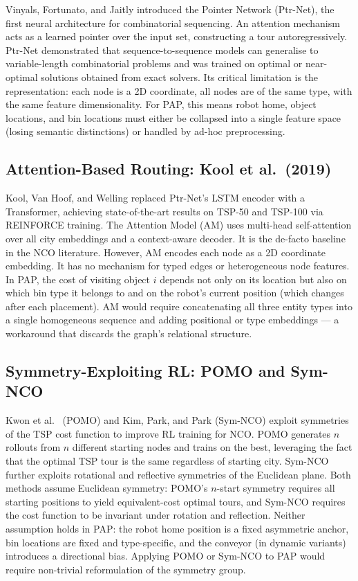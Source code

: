 \documentclass[conference]{IEEEtran}
\begin{document}
Vinyals, Fortunato, and Jaitly \cite{vinyals2015pointer} introduced the Pointer Network (Ptr-Net), the first neural architecture for combinatorial sequencing. An attention mechanism acts as a learned pointer over the input set, constructing a tour autoregressively. Ptr-Net demonstrated that sequence-to-sequence models can generalise to variable-length combinatorial problems and was trained on optimal or near-optimal solutions obtained from exact solvers. Its critical limitation is the representation: each node is a 2D coordinate, all nodes are of the same type, with the same feature dimensionality. For PAP, this means robot home, object locations, and bin locations must either be collapsed into a single feature space (losing semantic distinctions) or handled by ad-hoc preprocessing.

\subsection{Attention-Based Routing: Kool et al.\ (2019)}

Kool, Van Hoof, and Welling \cite{kool2019attention} replaced Ptr-Net's LSTM encoder with a Transformer, achieving state-of-the-art results on TSP-50 and TSP-100 via REINFORCE training. The Attention Model (AM) uses multi-head self-attention over all city embeddings and a context-aware decoder. It is the de-facto baseline in the NCO literature. However, AM encodes each node as a 2D coordinate embedding. It has no mechanism for typed edges or heterogeneous node features. In PAP, the cost of visiting object $i$ depends not only on its location but also on which bin type it belongs to and on the robot's current position (which changes after each placement). AM would require concatenating all three entity types into a single homogeneous sequence and adding positional or type embeddings --- a workaround that discards the graph's relational structure.

\subsection{Symmetry-Exploiting RL: POMO and Sym-NCO}

Kwon et al.\ \cite{kwon2020pomo} (POMO) and Kim, Park, and Park \cite{kim2022symnco} (Sym-NCO) exploit symmetries of the TSP cost function to improve RL training for NCO. POMO generates $n$ rollouts from $n$ different starting nodes and trains on the best, leveraging the fact that the optimal TSP tour is the same regardless of starting city. Sym-NCO further exploits rotational and reflective symmetries of the Euclidean plane. Both methods assume Euclidean symmetry: POMO's $n$-start symmetry requires all starting positions to yield equivalent-cost optimal tours, and Sym-NCO requires the cost function to be invariant under rotation and reflection. Neither assumption holds in PAP: the robot home position is a fixed asymmetric anchor, bin locations are fixed and type-specific, and the conveyor (in dynamic variants) introduces a directional bias. Applying POMO or Sym-NCO to PAP would require non-trivial reformulation of the symmetry group.
\end{document}
